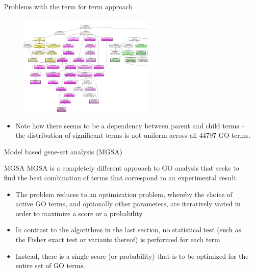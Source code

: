 \documentclass{beamer}
\begin{document}
\begin{frame}{Problems with the term for term approach}
 \begin{figure}
 \centering
 \includegraphics[width=0.6\textwidth]{./img/TfT-example.png}
\end{figure}

 \begin{itemize}
  \item Note how there seems to be a dependency between parent and child terms -- the distribution 
of significant terms is not uniform across all 44797 GO terms.
 \end{itemize}
\end{frame}

\begin{frame}{Model based gene-set analysis (MGSA)}
 \begin{mybluebox}{MGSA}
  MGSA is a completely different approach to GO
analysis that seeks to find the best combination of terms that
correspond to an experimental result.
 \end{mybluebox}

 \begin{itemize}
  \item The
problem reduces to an optimization problem, whereby the choice of
active GO terms, and optionally other parameters, are iteratively
varied in order to maximize a score or a probability.
\item   In contrast to
the algorithms in the last section, no statistical test (such as the
Fisher exact test or variants thereof) is performed for each term
\item Instead, there is a single score (or probability) that is to be
optimized for the entire set of GO terms.
 \end{itemize}

\end{frame}
\end{document}
